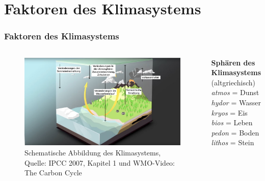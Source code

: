 \section{Faktoren des Klimasystems}


\begin{frame}
  \frametitle{Faktoren des Klimasystems}
  \begin{columns}
	\begin{figure}
	 	\centering
	 	\includegraphics[width=\linewidth]{bilder/WMO_Cycles_factors_general.png}
	 	\caption{Schematische Abbildung des Klimasystems, Quelle: IPCC 2007, Kapitel 1 und WMO-Video: The Carbon Cycle} %
	\end{figure}
  \textbf{Sphären des Klimasystems}\\
  (altgriechisch)\\[1em]
  \textit{atmos} = Dunst\\
  \textit{hydor} = Wasser\\
  \textit{kryos} = Eis\\
  \textit{bios} = Leben\\
  \textit{pedon} = Boden\\
  \textit{lithos} = Stein
	\end{columns}


\end{frame}

